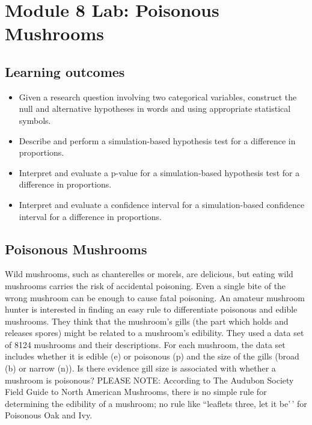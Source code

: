 \documentclass[
]{report}
\begin{document}
\section{Module 8 Lab: Poisonous Mushrooms}\label{module-8-lab-poisonous-mushrooms}


\subsection{Learning outcomes}\label{learning-outcomes-11}

\begin{itemize}
\item
  Given a research question involving two categorical variables, construct the null and alternative hypotheses
  in words and using appropriate statistical symbols.
\item
  Describe and perform a simulation-based hypothesis test for a difference in proportions.
\item
  Interpret and evaluate a p-value for a simulation-based hypothesis test for a difference in proportions.
\item
  Interpret and evaluate a confidence interval for a simulation-based confidence interval for a difference in proportions.
\end{itemize}

\subsection{Poisonous Mushrooms}\label{poisonous-mushrooms}

Wild mushrooms, such as chanterelles or morels, are delicious, but eating wild mushrooms carries the risk of accidental poisoning. Even a single bite of the wrong mushroom can be enough to cause fatal poisoning. An amateur mushroom hunter is interested in finding an easy rule to differentiate poisonous and edible mushrooms. They think that the mushroom's gills (the part which holds and releases spores) might be related to a mushroom's edibility. They used a data set of 8124 mushrooms and their descriptions. For each mushroom, the data set includes whether it is edible (e) or poisonous (p) and the size of the gills (broad (b) or narrow (n)). Is there evidence gill size is associated with whether a mushroom is poisonous? PLEASE NOTE: According to The Audubon Society Field Guide to North American Mushrooms, there is no simple rule for determining the edibility of a mushroom; no rule like ``leaflets three, let it be'\,' for Poisonous Oak and Ivy.
\end{document}
